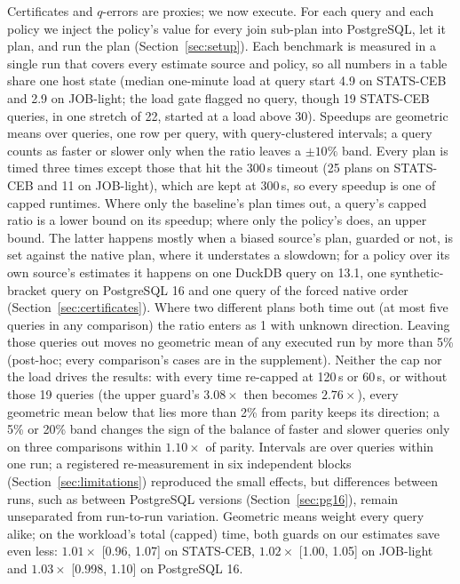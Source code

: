\documentclass[sigconf, nonacm]{acmart}
\begin{document}
Certificates and $q$-errors are proxies; we now execute. For each query and
each policy we inject the policy's value for every join sub-plan into
PostgreSQL, let it plan, and run the plan (Section~\ref{sec:setup}). Each
benchmark is measured in a single run that covers every estimate source and
policy, so all numbers in a table share one host state (median one-minute load
at query start 4.9 on STATS-CEB and 2.9 on JOB-light; the load gate flagged no
query, though 19 STATS-CEB queries, in one stretch of 22, started at a load
above 30). Speedups are geometric means over queries, one row per query, with
query-clustered intervals; a query counts as faster or slower only when the
ratio leaves a $\pm10\%$ band. Every plan is timed three times except those that
hit the 300\,s timeout (25 plans on STATS-CEB and 11 on JOB-light), which are
kept at 300\,s, so every speedup is one of capped runtimes. Where only the
baseline's plan times out, a query's capped ratio is a lower bound on its
speedup; where only the policy's does, an upper bound. The latter happens
mostly when a biased source's plan, guarded or not, is set against the native plan, where it
understates a slowdown; for a policy over its own source's estimates it happens
on one DuckDB query on 13.1, one synthetic-bracket query on PostgreSQL 16 and
one query of the forced native order (Section~\ref{sec:certificates}).
Where two different plans both time out (at most five queries in any
comparison) the ratio enters as 1 with unknown direction. Leaving those
queries out moves no geometric mean of any executed run by more than 5\%
(post-hoc; every comparison's cases are in the supplement). Neither the cap nor the load
drives the results: with every time re-capped at 120\,s or 60\,s, or without
those 19 queries (the upper guard's $3.08\times$ then becomes $2.76\times$),
every geometric mean below that lies more than 2\% from parity keeps its
direction; a 5\% or 20\% band changes the sign of the balance of faster and
slower queries only on three comparisons within $1.10\times$ of parity.
Intervals are over queries within one run; a registered re-measurement in
six independent blocks (Section~\ref{sec:limitations}) reproduced the small
effects, but differences between runs, such as between PostgreSQL versions
(Section~\ref{sec:pg16}), remain unseparated from run-to-run variation.
Geometric means weight every query alike; on the workload's total (capped)
time, both guards on our estimates save even less: $1.01\times$ [0.96, 1.07]
on STATS-CEB, $1.02\times$ [1.00, 1.05] on JOB-light and $1.03\times$ [0.998,
1.10] on PostgreSQL 16.
\end{document}
